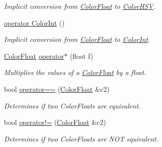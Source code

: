 \begin{DoxyCompactItemize}
\begin{DoxyCompactList}\small\item\em Implicit conversion from \hyperlink{structtsgl_1_1_color_float}{Color\+Float} to \hyperlink{structtsgl_1_1_color_h_s_v}{Color\+H\+S\+V}. \end{DoxyCompactList}\item 
\hyperlink{structtsgl_1_1_color_float_a4ef5398fd1ee469dd9b1b43c9ce5c00d}{operator Color\+Int} ()
\begin{DoxyCompactList}\small\item\em Implicit conversion from \hyperlink{structtsgl_1_1_color_float}{Color\+Float} to \hyperlink{structtsgl_1_1_color_int}{Color\+Int}. \end{DoxyCompactList}\item 
\hyperlink{structtsgl_1_1_color_float}{Color\+Float} \hyperlink{structtsgl_1_1_color_float_a09d7cc47ac3d0e23ef7339ccf33111a5}{operator$\ast$} (float f)
\begin{DoxyCompactList}\small\item\em Multiplies the values of a \hyperlink{structtsgl_1_1_color_float}{Color\+Float} by a float. \end{DoxyCompactList}\item 
bool \hyperlink{structtsgl_1_1_color_float_ac29ecf4a36624050af433d691e65651c}{operator==} (\hyperlink{structtsgl_1_1_color_float}{Color\+Float} \&c2)
\begin{DoxyCompactList}\small\item\em Determines if two Color\+Floats are equivalent. \end{DoxyCompactList}\item 
bool \hyperlink{structtsgl_1_1_color_float_afd92fcf8743d931cfbcf405209c923fc}{operator!=} (\hyperlink{structtsgl_1_1_color_float}{Color\+Float} \&c2)
\begin{DoxyCompactList}\small\item\em Determines if two Color\+Floats are {\itshape N\+O\+T} equivalent. \end{DoxyCompactList}\end{DoxyCompactItemize}
